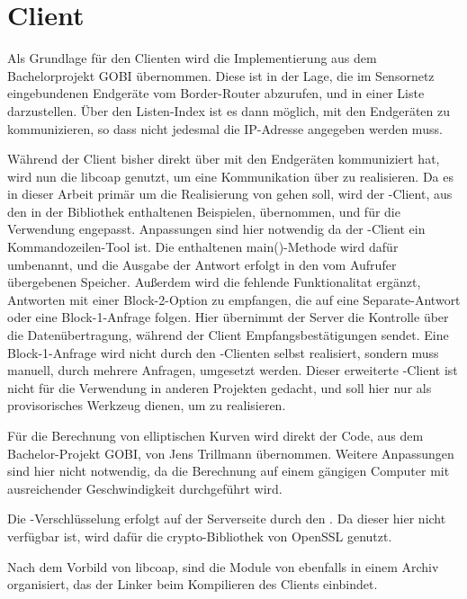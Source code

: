 \section{Client}
\label{sec:client}

Als Grundlage für den Clienten wird die Implementierung aus dem Bachelorprojekt GOBI übernommen. Diese ist in der Lage, die im Sensornetz eingebundenen
Endgeräte vom Border-Router abzurufen, und in einer Liste darzustellen. Über den Listen-Index ist es dann möglich, mit den Endgeräten zu kommunizieren,
so dass nicht jedesmal die IP-Adresse angegeben werden muss.

Während der Client bisher direkt über  mit den Endgeräten kommuniziert hat, wird nun die libcoap \cite{libcoap} genutzt, um eine Kommunikation
über  zu realisieren. Da es in dieser Arbeit primär um die Realisierung von  gehen soll, wird der -Client, aus den in der
Bibliothek enthaltenen Beispielen, übernommen, und für die Verwendung engepasst. Anpassungen sind hier notwendig da der -Client ein
Kommandozeilen-Tool ist. Die enthaltenen main()-Methode wird dafür umbenannt, und die Ausgabe der Antwort erfolgt in den vom Aufrufer übergebenen Speicher.
Außerdem wird die fehlende Funktionalitat ergänzt, Antworten mit einer Block-2-Option zu empfangen, die auf eine Separate-Antwort oder eine Block-1-Anfrage
folgen. Hier übernimmt der Server die Kontrolle über die Datenübertragung, während der Client Empfangsbestätigungen sendet. Eine Block-1-Anfrage wird
nicht durch den -Clienten selbst realisiert, sondern muss manuell, durch mehrere Anfragen, umgesetzt werden. Dieser erweiterte -Client
ist nicht für die Verwendung in anderen Projekten gedacht, und soll hier nur als provisorisches Werkzeug dienen, um  zu realisieren.

Für die Berechnung von elliptischen Kurven wird direkt der Code, aus dem Bachelor-Projekt GOBI, von Jens Trillmann übernommen. Weitere Anpassungen
sind hier nicht notwendig, da die Berechnung auf einem gängigen Computer mit ausreichender Geschwindigkeit durchgeführt wird.

Die -Verschlüsselung erfolgt auf der Serverseite durch den . Da dieser hier nicht verfügbar ist, wird dafür die
crypto-Bibliothek von OpenSSL \cite{openssl} genutzt. 

Nach dem Vorbild von libcoap, sind die Module von  ebenfalls in einem Archiv organisiert, das der Linker beim Kompilieren des Clients einbindet.

